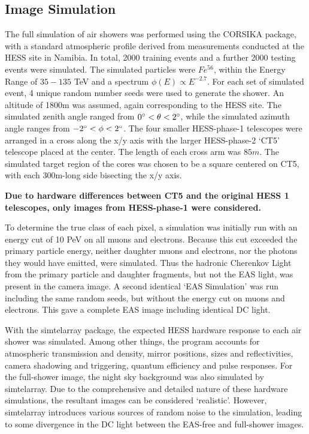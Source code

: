 \documentclass{article}
\begin{document}
\subsection{Image Simulation}
The full simulation of air showers was performed using the CORSIKA package, with a standard atmospheric profile derived from measurements conducted at the HESS site in Namibia. In total, 2000 training events and a further 2000 testing events were simulated. The simulated particles were $Fe^{56}$, within the Energy Range of $35-135$ TeV and a spectrum $\phi(E) \propto E^{-2.7}$. For each set of simulated event, 4 unique random number seeds were used to generate the shower. An altitude of 1800m was assumed, again corresponding to the HESS site. The simulated zenith angle ranged from $0\degree < \theta < 2 \degree$, while the simulated azimuth angle ranges from $-2\degree < \phi < 2 \degree$. The four smaller HESS-phase-1 telescopes were arranged in a cross along the x/y axis with the larger HESS-phase-2 \textquoteleft CT5' telescope placed at the center. The length of each cross arm was $85m$. The simulated target region of the cores was chosen to be a square centered on CT5, with each 300m-long side bisecting the x/y axis. 

\textbf{Due to hardware differences between CT5 and the original HESS 1 telescopes, only images from HESS-phase-1 were considered.}

To determine the true class of each pixel, a simulation was initially run with an energy cut of 10 PeV on all muons and electrons. Because this cut exceeded the primary particle energy, neither daughter muons and electrons, nor the photons they would have emitted, were simulated. Thus the hadronic Cherenkov Light from the primary particle and daughter fragments, but not the EAS light, was present in the camera image. A second identical \textquoteleft EAS Simulation' was run including the same random seeds, but without the energy cut on muons and electrons. This gave a complete EAS image including identical DC light.

With the sim\textunderscore telarray package, the expected HESS hardware response to each air shower was simulated. Among other things, the program accounts for atmospheric transmission and density, mirror positions, sizes and reflectivities, camera shadowing and triggering, quantum efficiency and pulse responses. For the full-shower image, the night sky background was also simulated by sim\textunderscore telarray. Due to the comprehensive and detailed nature of these hardware simulations, the resultant images can be considered \textquoteleft realistic'.  However, sim\textunderscore telarray introduces various sources of random noise to the simulation, leading to some divergence in the DC light between the EAS-free and full-shower images.
\end{document}
